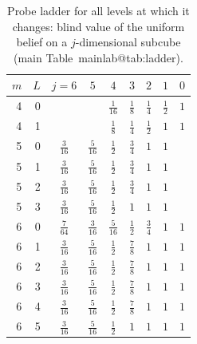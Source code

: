 \documentclass[11pt,a4paper]{article}
\makeatletter
\theoremstyle{plain}
\theoremstyle{definition}
\theoremstyle{remark}
\newcommand{\mref}[1]{\csname mainlab@#1\endcsname}
\makeatother
\begin{document}
\begin{table}[H]\centering\small
\caption{Probe ladder for all levels at which it changes: blind value of the uniform belief on a $j$-dimensional subcube (main Table~\mref{tab:ladder}).}\label{tab:S5ladder}
\begin{tabular}{rrccccccc}
\toprule
$m$ & $L$ & $j=6$ & $5$ & $4$ & $3$ & $2$ & $1$ & $0$\\
\midrule
4 & 0 &  &  & $\tfrac{1}{16}$ & $\tfrac{1}{8}$ & $\tfrac{1}{4}$ & $\tfrac{1}{2}$ & $1$\\
4 & 1 &  &  & $\tfrac{1}{8}$ & $\tfrac{1}{4}$ & $\tfrac{1}{2}$ & $1$ & $1$\\
5 & 0 & $\tfrac{3}{16}$ & $\tfrac{5}{16}$ & $\tfrac{1}{2}$ & $\tfrac{3}{4}$ & $1$ & $1$\\
5 & 1 & $\tfrac{3}{16}$ & $\tfrac{5}{16}$ & $\tfrac{1}{2}$ & $\tfrac{3}{4}$ & $1$ & $1$\\
5 & 2 & $\tfrac{3}{16}$ & $\tfrac{5}{16}$ & $\tfrac{1}{2}$ & $\tfrac{3}{4}$ & $1$ & $1$\\
5 & 3 & $\tfrac{3}{16}$ & $\tfrac{5}{16}$ & $\tfrac{1}{2}$ & $1$ & $1$ & $1$\\
6 & 0 & $\tfrac{7}{64}$ & $\tfrac{3}{16}$ & $\tfrac{5}{16}$ & $\tfrac{1}{2}$ & $\tfrac{3}{4}$ & $1$ & $1$\\
6 & 1 & $\tfrac{3}{16}$ & $\tfrac{5}{16}$ & $\tfrac{1}{2}$ & $\tfrac{7}{8}$ & $1$ & $1$ & $1$\\
6 & 2 & $\tfrac{3}{16}$ & $\tfrac{5}{16}$ & $\tfrac{1}{2}$ & $\tfrac{7}{8}$ & $1$ & $1$ & $1$\\
6 & 3 & $\tfrac{3}{16}$ & $\tfrac{5}{16}$ & $\tfrac{1}{2}$ & $\tfrac{7}{8}$ & $1$ & $1$ & $1$\\
6 & 4 & $\tfrac{3}{16}$ & $\tfrac{5}{16}$ & $\tfrac{1}{2}$ & $\tfrac{7}{8}$ & $1$ & $1$ & $1$\\
6 & 5 & $\tfrac{3}{16}$ & $\tfrac{5}{16}$ & $\tfrac{1}{2}$ & $1$ & $1$ & $1$ & $1$\\
\bottomrule
\end{tabular}
\end{table}
\end{document}
